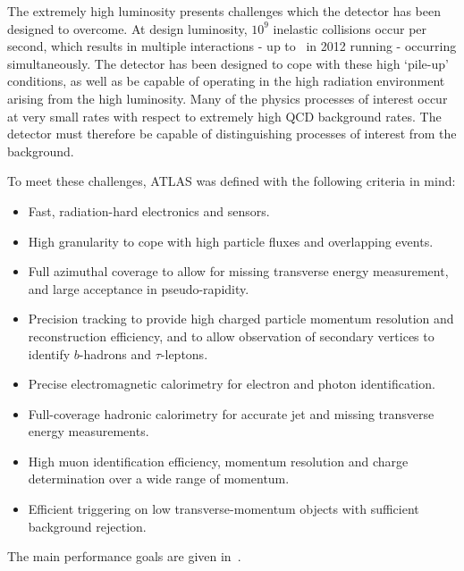 The extremely high luminosity presents challenges which the detector has been
designed to overcome. At design luminosity, $10^9$ inelastic collisions occur
per second, which results in multiple interactions - up to
\PeakIntPerBunchCrossing\ in 2012 running - occurring simultaneously. The
detector has been designed to cope with these high `pile-up' conditions, as well
as be capable of operating in the high radiation environment arising from the
high luminosity. Many of the physics processes of interest occur at very small
rates with respect to extremely high QCD background rates. The detector must
therefore be capable of distinguishing processes of interest from the
background. 

To meet these challenges, ATLAS was defined with the following
criteria in mind:

\begin{itemize}
\item Fast, radiation-hard electronics and sensors.
\item High granularity to  cope with high particle fluxes and overlapping events.
\item Full azimuthal coverage to allow for missing transverse energy
measurement, and large acceptance in pseudo-rapidity.
\item Precision tracking to provide high charged particle momentum resolution
and reconstruction efficiency, and to allow observation of secondary vertices to
identify $b$-hadrons and $\tau$-leptons.
\item Precise electromagnetic calorimetry for electron and photon
identification.
\item Full-coverage hadronic calorimetry for accurate jet and missing transverse
energy measurements.
\item High muon identification efficiency, momentum resolution and charge determination over a wide range of
momentum.
\item Efficient triggering on low transverse-momentum objects with sufficient
background rejection.
\end{itemize}

The main performance goals are given in~.

